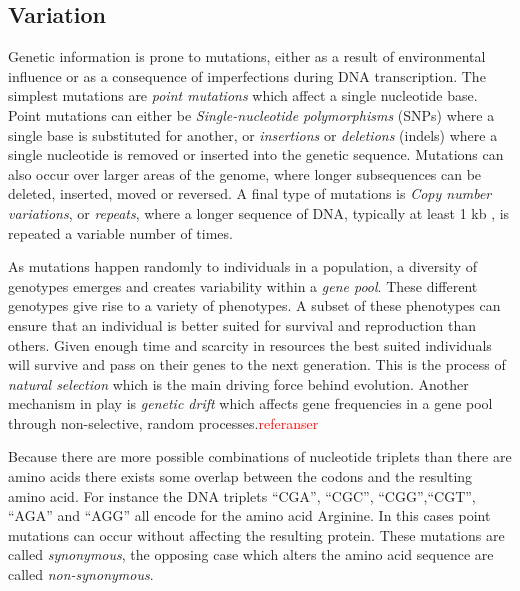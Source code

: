 \documentclass[thesis.tex]{subfiles}
\begin{document}
\subsection{Variation}
\label{sec:genetic_variation}
Genetic information is prone to mutations, either as a result of environmental influence or as a consequence of imperfections during DNA transcription. The simplest mutations are \textit{point mutations} which affect a single nucleotide base. Point mutations can either be \textit{Single-nucleotide polymorphisms} (SNPs) where a single base is substituted for another, or \textit{insertions} or \textit{deletions} (indels) where a single nucleotide is removed or inserted into the genetic sequence. Mutations can also occur over larger areas of the genome, where longer subsequences can be deleted, inserted, moved or reversed. A final type of mutations is \textit{Copy number variations}, or \textit{repeats}, where a longer sequence of DNA, typically at least 1 kb \cite{copy_number_variation_new_insights_in_genome_diversity}, is repeated a variable number of times.\\
\par\noindent
As mutations happen randomly to individuals in a population, a diversity of genotypes emerges and creates variability within a \textit{gene pool}. These different genotypes give rise to a variety of phenotypes. A subset of these phenotypes can ensure that an individual is better suited for survival and reproduction than others. Given enough time and scarcity in resources the best suited individuals will survive and pass on their genes to the next generation. This is the process of \textit{natural selection} which is the main driving force behind evolution. Another mechanism in play is \textit{genetic drift} which affects gene frequencies in a gene pool through non-selective, random processes.\textcolor{red}{referanser} \\
\par\noindent
Because there are more possible combinations of nucleotide triplets than there are amino acids there exists some overlap between the codons and the resulting amino acid. For instance the DNA triplets ``CGA'', ``CGC'', ``CGG'',``CGT'', ``AGA'' and ``AGG''  all encode for the amino acid Arginine. In this cases point mutations can occur without affecting the resulting protein. These mutations are called \textit{synonymous}, the opposing case which alters the amino acid sequence are called \textit{non-synonymous}.
\end{document}
